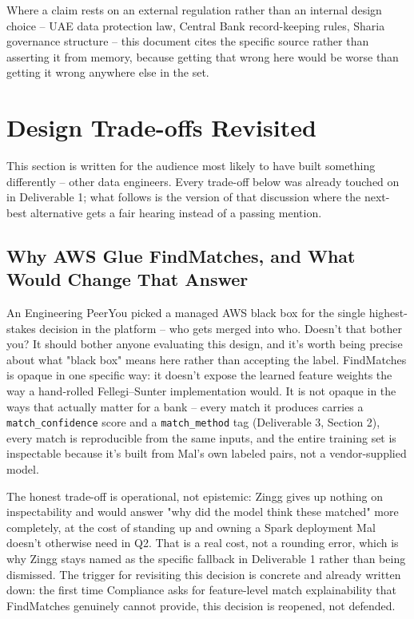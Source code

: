 \documentclass[11pt]{article}
\begin{document}
Where a claim rests on an external regulation rather than an internal design choice -- UAE data protection law, Central Bank record-keeping rules, Sharia governance structure -- this document cites the specific source rather than asserting it from memory, because getting that wrong here would be worse than getting it wrong anywhere else in the set.

\section{Design Trade-offs Revisited}
\label{sec:tradeoffs}
This section is written for the audience most likely to have built something differently -- other data engineers. Every trade-off below was already touched on in Deliverable 1; what follows is the version of that discussion where the next-best alternative gets a fair hearing instead of a passing mention.

\subsection{Why AWS Glue FindMatches, and What Would Change That Answer}
\begin{stakeholderq}{An Engineering Peer}{You picked a managed AWS black box for the single highest-stakes decision in the platform -- who gets merged into who. Doesn't that bother you?}
It should bother anyone evaluating this design, and it's worth being precise about what "black box" means here rather than accepting the label. FindMatches is opaque in one specific way: it doesn't expose the learned feature weights the way a hand-rolled Fellegi--Sunter implementation would. It is not opaque in the ways that actually matter for a bank -- every match it produces carries a \texttt{match\_confidence} score and a \texttt{match\_method} tag (Deliverable 3, Section 2), every match is reproducible from the same inputs, and the entire training set is inspectable because it's built from Mal's own labeled pairs, not a vendor-supplied model.

The honest trade-off is operational, not epistemic: Zingg gives up nothing on inspectability and would answer "why did the model think these matched" more completely, at the cost of standing up and owning a Spark deployment Mal doesn't otherwise need in Q2. That is a real cost, not a rounding error, which is why Zingg stays named as the specific fallback in Deliverable 1 rather than being dismissed. The trigger for revisiting this decision is concrete and already written down: the first time Compliance asks for feature-level match explainability that FindMatches genuinely cannot provide, this decision is reopened, not defended.
\end{stakeholderq}
\end{document}
